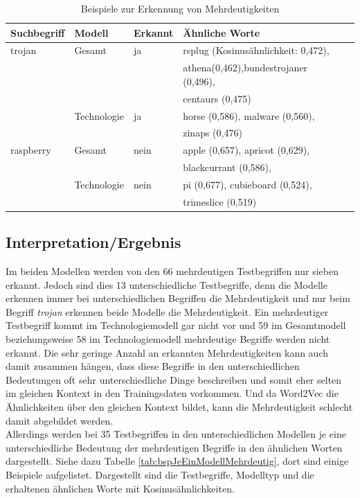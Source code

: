 \documentclass[12pt,a4paper]{report}
\begin{document}
\begin{table}[H]
\caption{Beispiele zur Erkennung von Mehrdeutigkeiten}
\label{tab:bspMehrdeutigkeiten}
\begin{center}
\begin{tabular}{|l||l|l|l|l|}
\hline
\textbf{Suchbegriff} & \textbf{Modell} & \textbf{Erkannt} & \textbf{Ähnliche Worte}   \\
\hline
 trojan & Gesamt & ja &rsplug (Kosinusähnlichkeit: 0,472),  \\
 &	&	& athena(0,462),bundestrojaner (0,496),  \\
 &&&centaurs (0,475)\\
 &  Technologie & ja & horse (0,586), malware (0,560), \\
 &&&zinaps (0,476)\\
 \hline
 
raspberry& Gesamt& nein & apple (0,657), apricot (0,629), \\
&&&blackcurrant (0,586),  \\
&Technologie & nein & pi (0,677), cubieboard (0,524),\\
&&& trimeslice (0,519)\\
\hline
 
\end{tabular}
\end{center}
\end{table}
		
		
		\subsection*{Interpretation/Ergebnis}
		


		
		Im beiden Modellen werden von den 66 mehrdeutigen Testbegriffen nur sieben erkannt. Jedoch sind dies 13 unterschiedliche Testbegriffe, denn die Modelle erkennen immer bei unterschiedlichen Begriffen die Mehrdeutigkeit und nur beim Begriff \textit{trojan} erkennen beide Modelle die Mehrdeutigkeit. Ein mehrdeutiger Testbegriff kommt im Technologiemodell gar nicht vor und 59 im Gesamtmodell beziehungsweise 58 im Technologiemodell mehrdeutige Begriffe werden nicht erkannt. Die sehr geringe Anzahl an erkannten Mehrdeutigkeiten kann auch damit zusammen hängen, dass diese Begriffe in den unterschiedlichen Bedeutungen oft sehr unterschiedliche Dinge beschreiben und somit eher selten im gleichen Kontext in den Trainingsdaten vorkommen. Und da Word2Vec die Ähnlichkeiten über den gleichen Kontext bildet, kann die Mehrdeutigkeit schlecht damit abgebildet werden.\\
Allerdings werden bei 35 Testbegriffen in den unterschiedlichen Modellen je eine unterschiedliche Bedeutung der mehrdeutigen Begriffe in den ähnlichen Worten dargestellt. Siehe dazu Tabelle \ref{tab:bspJeEinModellMehrdeutig}, dort sind einige Beispiele aufgelistet. Dargestellt sind die Testbegriffe, Modelltyp und die erhaltenen ähnlichen Worte mit Kosinusähnlichkeiten.\\
		
\end{document}
